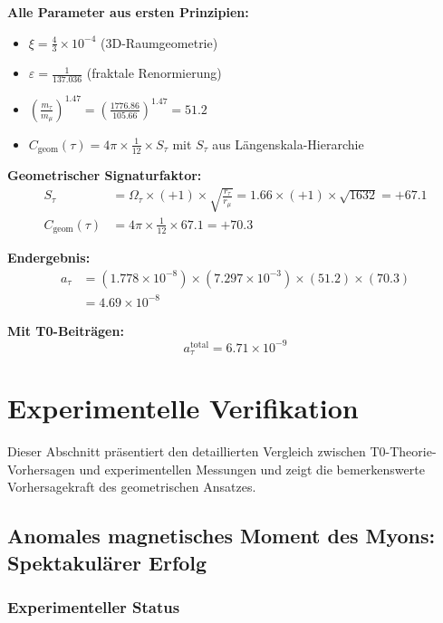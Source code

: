 \documentclass[12pt,a4paper]{article}
\numberwithin{equation}{section}
\newcommand{\xipar}{\xi}
\newcommand{\epsilonT}{\varepsilon}
\newcommand{\Cgeom}{C_{\text{geom}}}
\newcommand{\Omegafactor}{\Omega}
\begin{document}
	\textbf{Alle Parameter aus ersten Prinzipien:}
	\begin{itemize}
		\item $\xipar = \frac{4}{3} \times 10^{-4}$ (3D-Raumgeometrie)
		\item $\epsilonT = \frac{1}{137.036}$ (fraktale Renormierung)
		\item $\left(\frac{m_\tau}{m_\mu}\right)^{1.47} = \left(\frac{1776.86}{105.66}\right)^{1.47} = 51.2$
		\item $\Cgeom(\tau) = 4\pi \times \frac{1}{12} \times S_\tau$ mit $S_\tau$ aus Längenskala-Hierarchie
	\end{itemize}
	
	\textbf{Geometrischer Signaturfaktor:}
	\begin{align}
		S_\tau &= \Omegafactor_\tau \times (+1) \times \sqrt{\frac{r_\tau}{r_\mu}} = 1.66 \times (+1) \times \sqrt{1632} = +67.1\\
		\Cgeom(\tau) &= 4\pi \times \frac{1}{12} \times 67.1 = +70.3
		\label{eq:tau_signature}
	\end{align}
	
	\textbf{Endergebnis:}
	\begin{align}
		a_\tau &= (1.778 \times 10^{-8}) \times (7.297 \times 10^{-3}) \times (51.2) \times (70.3)\\
		&= 4.69 \times 10^{-8}
		\label{eq:tau_basic}
	\end{align}
	
	\textbf{Mit T0-Beiträgen:}
	\begin{equation}
		a_\tau^{\text{total}} = 6.71 \times 10^{-9}
		\label{eq:tau_total}
	\end{equation}
	
	\section{Experimentelle Verifikation}
	
	Dieser Abschnitt präsentiert den detaillierten Vergleich zwischen T0-Theorie-Vorhersagen und experimentellen Messungen und zeigt die bemerkenswerte Vorhersagekraft des geometrischen Ansatzes.
	
	\subsection{Anomales magnetisches Moment des Myons: Spektakulärer Erfolg}
	
	\subsubsection{Experimenteller Status}
	
\end{document}
